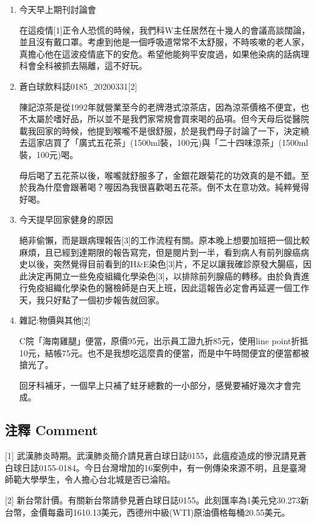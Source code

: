 \documentclass[a5paper, 12pt
]{book}
\begin{document}
\begin{enumerate}
\def\labelenumi{\arabic{enumi}.}
\item
  今天早上期刊討論會

  在這疫情{[}1{]}正令人恐慌的時候，我們科W主任居然在十幾人的會議高談闊論，並且沒有戴口罩。考慮到他是一個呼吸道常常不太舒服，不時咳嗽的老人家，真擔心他在這波疫情底下的安危。希望他能夠平安度過，如果他染病的話病理科會全科被抓去隔離，這不好玩。
\item
  蒼白球飲料誌0185\_20200331{[}2{]}

  陳記涼茶是從1992年就營業至今的老牌港式涼茶店，因為涼茶價格不便宜，也不太屬於嗜好品，所以並不是我們家常規會買來喝的品項。但今天母后從醫院載我回家的時候，他提到喉嚨不是很舒服，於是我們母子討論了一下，決定繞去這家店買了「廣式五花茶」(1500ml裝，100元)與「二十四味涼茶」(1500ml裝，100元)喝。

  母后喝了五花茶以後，喉嚨就舒服多了，金銀花跟菊花的功效真的是不錯。至於我為什麼會跟著喝？喔因為我很喜歡喝五花茶。倒不太在意功效。純粹覺得好喝。
\item
  今天提早回家健身的原因

  絕非偷懶，而是跟病理報告{[}3{]}的工作流程有關。原本晚上想要加班把一個比較麻煩，且已經到達期限的報告寫完，但是閱片到一半，看到病人有前列腺癌病史以後，突然覺得目前看到的H\&E染色{[}3{]}片，不足以讓我確診原發大腸癌，因此決定再開立一些免疫組織化學染色{[}3{]}，以排除前列腺癌的轉移。由於負責進行免疫組織化學染色的醫檢師是白天上班，因此這報告必定會再延遲一個工作天，我只好點了一個初步報告就回家。
\item
  雜記:物價與其他{[}2{]}

  C院「海南雞腿」便當，原價95元，出示員工證九折85元，使用line
  point折抵10元，結帳75元。也不是我想吃這麼貴的便當，而是中午時間便宜的便當都被搶光了。

  回牙科補牙，一個早上只補了蛀牙總數的一小部分，感覺要補好幾次才會完成。
\end{enumerate}

\hypertarget{ux6ce8ux91cb-comment-30}{%
\subsection{注釋 Comment}\label{ux6ce8ux91cb-comment-30}}

{[}1{]}
武漢肺炎時期。武漢肺炎簡介請見蒼白球日誌0155，此瘟疫造成的慘況請見蒼白球日誌0155-0184。今日台灣增加的16案例中，有一例傳染來源不明，且是臺灣師範大學學生，令人擔心台北城是否已淪陷。

{[}2{]}
新台幣計價。有關新台幣請參見蒼白球日誌0155。此刻匯率為1美元兌30.273新台幣，金價每盎司1610.13美元，西德州中級(WTI)原油價格每桶20.55美元。
\end{document}
